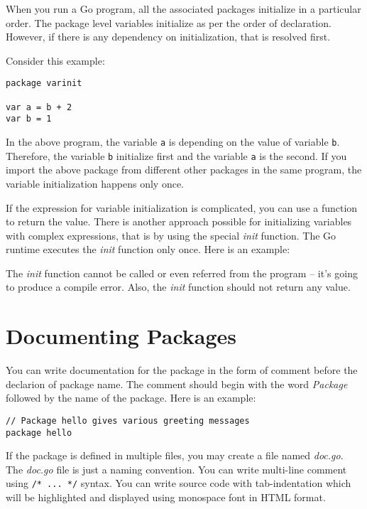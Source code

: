 When you run a Go program, all the associated packages initialize in a
particular order.  The package level variables initialize as per the
order of declaration.  However, if there is any dependency on
initialization, that is resolved first.

Consider this example:

\begin{lstlisting}[numbers=none]
package varinit

var a = b + 2
var b = 1
\end{lstlisting}

In the above program, the variable \texttt{a} is depending on the
value of variable \texttt{b}.  Therefore, the variable \texttt{b}
initialize first and the variable \texttt{a} is the second.  If you
import the above package from different other packages in the same
program, the variable initialization happens only once.

If the expression for variable initialization is complicated, you can
use a function to return the value.  There is another approach
possible for initializing variables with complex expressions, that is
by using the special \textit{init} function.  The Go runtime executes
the \textit{init} function only once.  Here is an example:



The \textit{init} function cannot be called or even referred from the
program -- it's going to produce a compile error.  Also,
the \textit{init} function should not return any value.

\section{Documenting Packages}

You can write documentation for the
package in the form of comment before the
declarion of package name.  The comment should begin with the
word \textit{Package} followed by the name of the package.  Here is an
example:

\begin{lstlisting}[numbers=none]
// Package hello gives various greeting messages
package hello
\end{lstlisting}

If the package is defined in multiple files, you may create a file
named \textit{doc.go}.  The \textit{doc.go} file is just a naming
convention.  You can write multi-line comment using \texttt{/* ... */}
syntax.  You can write source code with tab-indentation which will be
highlighted and displayed using monospace font in HTML format.

